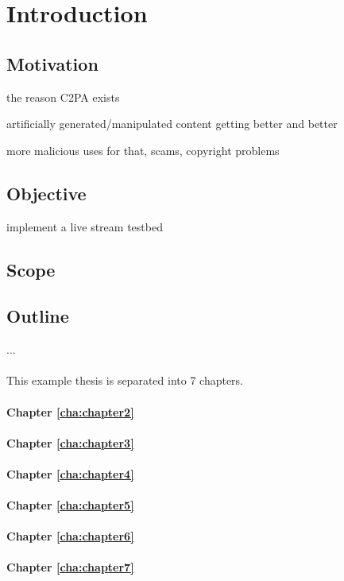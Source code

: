 \chapter{Introduction\label{cha:chapter1}}



\section{Motivation\label{sec:moti}}

the reason C2PA exists

artificially generated/manipulated content getting better and better

more malicious uses for that, scams, copyright problems

\section{Objective\label{sec:objective}}

implement a live stream testbed

\section{Scope\label{sec:scope}}


\section{Outline\label{sec:outline}}

...
\\
\\
\noindent This example thesis is separated into 7 chapters.
\\
\\
\textbf{Chapter \ref{cha:chapter2}} 
\\
\\
\textbf{Chapter \ref{cha:chapter3}} 
\\
\\
\textbf{Chapter \ref{cha:chapter4}}
\\
\\
\textbf{Chapter \ref{cha:chapter5}} 
\\
\\
\textbf{Chapter \ref{cha:chapter6}} 
\\
\\
\textbf{Chapter \ref{cha:chapter7}} 